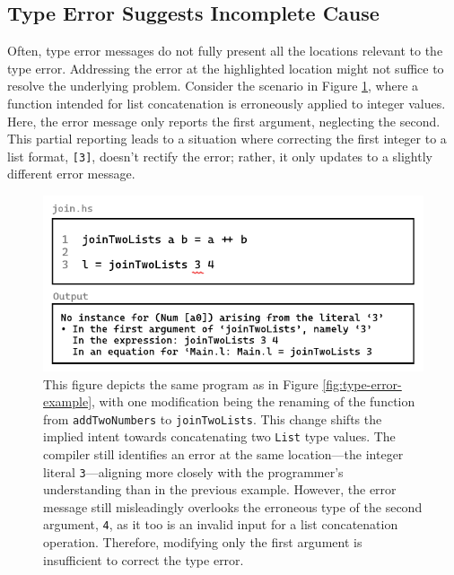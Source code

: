 \subsection{Type Error Suggests Incomplete Cause}
\label{subsec:imcomplete}

Often, type error messages do not fully present all the locations relevant to the type error. Addressing the error at the highlighted location might not suffice to resolve the underlying problem. Consider the scenario in Figure \ref{fig:type-error-example-2}, where a function intended for list concatenation is erroneously applied to integer values. Here, the error message only reports the first argument, neglecting the second. This partial reporting leads to a situation where correcting the first integer to a list format, \texttt{[3]}, doesn't rectify the error; rather, it only updates to a slightly different error message. 



\begin{figure}[]
  \includegraphics[width=\linewidth]{TypeErrorExample2}
  \caption[Illustrating a programming error in Haskell, featuring a function named \texttt{joinTwoLists} with a type error and the corresponding compiler output]{
    \label{fig:type-error-example-2}
    This figure depicts the same program as in Figure \ref{fig:type-error-example}, with one modification being the renaming of the function from \texttt{addTwoNumbers} to \texttt{joinTwoLists}. This change shifts the implied intent towards concatenating two \texttt{List} type values. The compiler still identifies an error at the same location—the integer literal \texttt{3}—aligning more closely with the programmer's understanding than in the previous example. However, the error message still misleadingly overlooks the erroneous type of the second argument, \texttt{4}, as it too is an invalid input for a list concatenation operation. Therefore, modifying only the first argument is insufficient to correct the type error.
    }
\end{figure}

